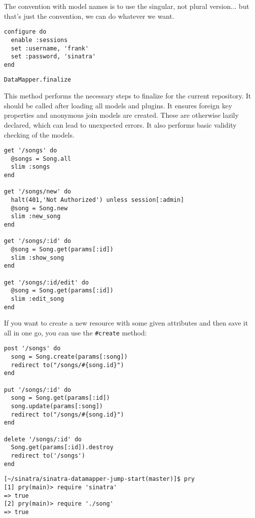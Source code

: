 The convention with model names is to use the singular, not plural version...
but that's just the convention, we can do whatever we want.

\begin{verbatim}
configure do
  enable :sessions
  set :username, 'frank'
  set :password, 'sinatra'
end
\end{verbatim}


\begin{verbatim}
DataMapper.finalize
\end{verbatim}
This method performs the  necessary steps to finalize \datamapper{} 
for the current repository. It should be called after loading all models and plugins.
It ensures foreign key properties and anonymous join models are
created. These are otherwise lazily declared, which can lead to
unexpected errors. It also performs basic validity checking of the
\datamapper{} models.

\begin{verbatim}
get '/songs' do
  @songs = Song.all
  slim :songs
end

get '/songs/new' do
  halt(401,'Not Authorized') unless session[:admin]
  @song = Song.new
  slim :new_song
end

get '/songs/:id' do
  @song = Song.get(params[:id])
  slim :show_song
end

get '/songs/:id/edit' do
  @song = Song.get(params[:id])
  slim :edit_song
end
\end{verbatim}


If you want to create a new resource with some given attributes and
then save it all in one go, you can use the \verb|#create| method:
\begin{verbatim}
post '/songs' do  
  song = Song.create(params[:song])
  redirect to("/songs/#{song.id}")
end

put '/songs/:id' do
  song = Song.get(params[:id])
  song.update(params[:song])
  redirect to("/songs/#{song.id}")
end

delete '/songs/:id' do
  Song.get(params[:id]).destroy
  redirect to('/songs')
end
\end{verbatim}

\begin{verbatim}
[~/sinatra/sinatra-datamapper-jump-start(master)]$ pry
[1] pry(main)> require 'sinatra'
=> true
[2] pry(main)> require './song'
=> true
\end{verbatim}

